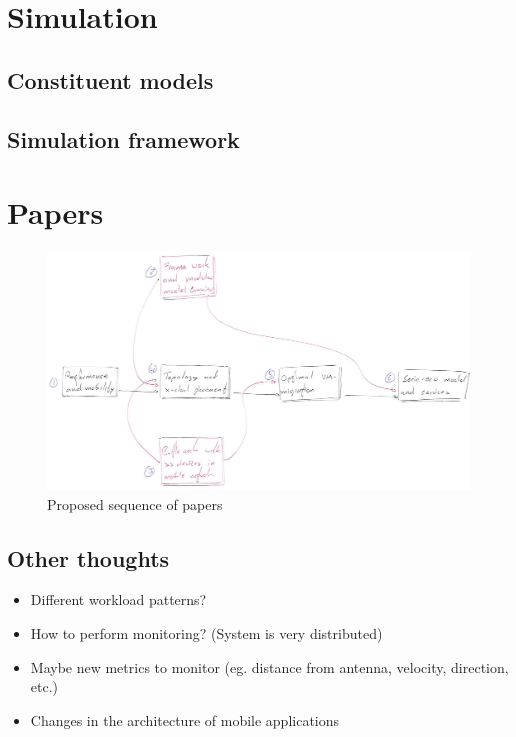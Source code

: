 \documentclass[conference]{IEEEtran}
\begin{document}
\section{Simulation}

\subsection{Constituent models}


\subsection{Simulation framework}



\section{Papers}
\begin{figure}[!H]
	\centering
	\includegraphics[width=\linewidth]{papers_sequence.jpg} 
	\caption{Proposed sequence of papers}
	\label{fig:papers_sequence}
\end{figure}






\subsection{Other thoughts} 

\begin{itemize}
\item Different workload patterns?
\item How to perform monitoring? (System is very distributed)
\item Maybe new metrics to monitor (eg. distance from antenna, velocity, direction, etc.)
\item Changes in the architecture of mobile applications
\end{itemize}




\end{document}

